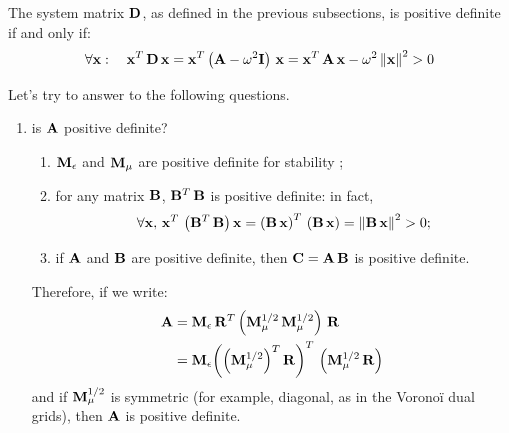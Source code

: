 The system matrix $\mathbf{D}$, as defined in the previous
subsections, is positive definite if and only if:
\begin{equation*}
  \forall \mathbf{x}: \quad
  {{\mathbf{x}}^T\,{\mathbf{D}\,\mathbf{x}}} =
  {{\mathbf{x}}^T\,{\left(\mathbf{A} - \omega^2
  \mathbf{I}\right)\,\mathbf{x}}} =
  {{\mathbf{x}}^T\,{\mathbf{A}\,\mathbf{x}}} -
  \omega^2 \left\lVert\mathbf{x}\right\rVert^2 > 0
\end{equation*}

Let's try to answer to the following questions.
\begin{enumerate}
\item is $\mathbf{A}$ positive definite?
  \begin{enumerate}
  \item $\mathbf{M}_\epsilon$ and $\mathbf{M}_\mu$ are positive
    definite for stability \cite{codecasa_baricentric,schuhmann_whitney};
  \item for any matrix $\mathbf{B}$, ${{\mathbf{B}}^T\,\mathbf{B}}$ is
    positive definite: in fact,
    \begin{equation*}
      \forall \mathbf{x},\,{{{\mathbf{x}}^T\,\left({{\mathbf{B}}^T\,\mathbf{B}}\right)}\,\mathbf{x}}
      = {{\left({\mathbf{B}\,\mathbf{x}}\right)}^T\,\left({\mathbf{B}\,\mathbf{x}}\right)}
      = \left\lVert{\mathbf{B}\,\mathbf{x}}\right\rVert^2 > 0;
    \end{equation*}
  \item if $\mathbf{A}$ and $\mathbf{B}$ are positive definite, then
    $\mathbf{C} = {\mathbf{A}\,\mathbf{B}}$ is positive definite.
  \end{enumerate}

  Therefore, if we write:
  \begin{equation*} \begin{split}
    \mathbf{A} & =
    {\mathbf{M}_\epsilon\,{{\mathbf{R}}^T\,{\left(
    {\mathbf{M}_\mu^{1/2}\,\mathbf{M}_\mu^{1/2}}
    \right)\,\mathbf{R}}}} \\
    & = \mathbf{M}_\epsilon {{\left({{\left( \mathbf{M}_\mu^{1/2} \right)}^T\,\mathbf{R}}\right)}^T\,\left({\mathbf{M}_\mu^{1/2}\,\mathbf{R}} \right)}
  \end{split} \end{equation*}
  and if $\mathbf{M}_\mu^{1/2}$ is symmetric (for example, diagonal, as in the
  Vorono\"i dual grids), then $\mathbf{A}$ is positive definite.
  

\end{enumerate}
